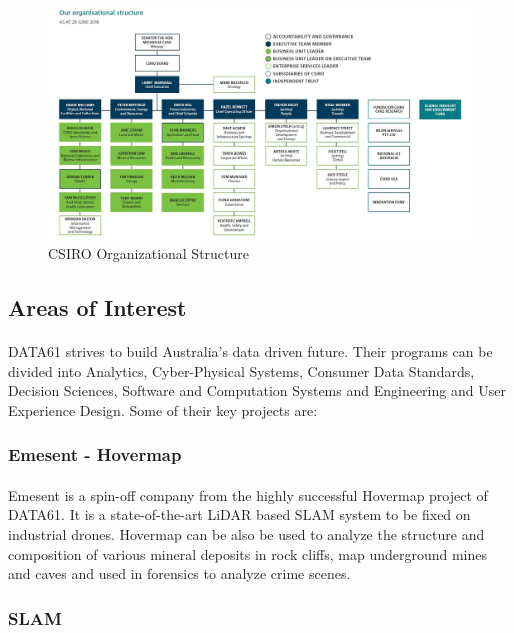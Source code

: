 \begin{figure}[h]
    \centering
    \includegraphics[width=16cm]{figures/csiro_struct.jpg}
    \caption{CSIRO Organizational Structure}\vspace{-4mm}
\end{figure}

\subsection{Areas of Interest}

\paragraph{}
DATA61 strives to build Australia's data driven future. Their programs can be divided into Analytics, Cyber-Physical Systems, Consumer Data Standards, Decision Sciences, Software and Computation Systems and Engineering and User Experience Design. Some of their key projects are:

\subsubsection*{Emesent - Hovermap}

\paragraph{}
Emesent is a spin-off company from the highly successful Hovermap project of DATA61. It is a state-of-the-art LiDAR based SLAM system to be fixed on industrial drones. Hovermap can be also be used to analyze the structure and composition of various mineral deposits in rock cliffs, map underground mines and caves and used in forensics to analyze crime scenes.

\subsubsection*{SLAM}
